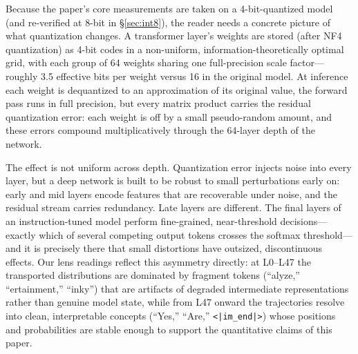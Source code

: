\documentclass[11pt,a4paper]{article}
\begin{document}
Because the paper's core measurements are taken on a 4-bit-quantized model (and re-verified at 8-bit in \S\ref{sec:int8}), the reader needs a concrete picture of what quantization changes. A transformer layer's weights are stored (after NF4 quantization) as 4-bit codes in a non-uniform, information-theoretically optimal grid, with each group of 64 weights sharing one full-precision scale factor---roughly 3.5 effective bits per weight versus 16 in the original model. At inference each weight is dequantized to an approximation of its original value, the forward pass runs in full precision, but every matrix product carries the residual quantization error: each weight is off by a small pseudo-random amount, and these errors compound multiplicatively through the 64-layer depth of the network.

The effect is not uniform across depth. Quantization error injects noise into every layer, but a deep network is built to be robust to small perturbations early on: early and mid layers encode features that are recoverable under noise, and the residual stream carries redundancy. Late layers are different. The final layers of an instruction-tuned model perform fine-grained, near-threshold decisions---exactly which of several competing output tokens crosses the softmax threshold---and it is precisely there that small distortions have outsized, discontinuous effects. Our lens readings reflect this asymmetry directly: at L0--L47 the transported distributions are dominated by fragment tokens (``alyze,'' ``ertainment,'' ``inky'') that are artifacts of degraded intermediate representations rather than genuine model state, while from L47 onward the trajectories resolve into clean, interpretable concepts (``Yes,'' ``Are,'' \texttt{<|im\_end|>}) whose positions and probabilities are stable enough to support the quantitative claims of this paper.
\end{document}
